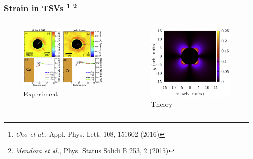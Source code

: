 \documentclass{beamer}
\begin{document}
\begin{frame}
\frametitle{Strain in TSVs%
\footnote{\emph{Cho et al.}, Appl. Phys. Lett. 108, 151602 (2016)}
\footnote{\emph{Mendoza et al.}, Phys. Status Solidi B 253, 2 (2016)}}
\begin{columns}
\begin{figure}
\centering
\includegraphics[width=\textwidth]{image-yojin}
\vspace*{0.5cm}
\caption{Experiment}
\end{figure}
\begin{figure}
\centering
\includegraphics[width=\textwidth]{image-bms}
\caption{Theory}
\end{figure}
\end{columns}
\end{frame}
\end{document}
